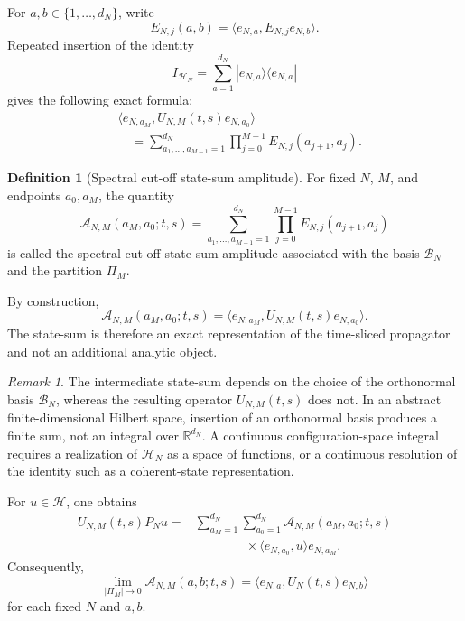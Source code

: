 \documentclass[11pt]{amsart}
\theoremstyle{plain}
\theoremstyle{definition}
\newtheorem{definition}[theorem]{Definition}
\theoremstyle{remark}
\newtheorem{remark}[theorem]{Remark}
\begin{document}
For \(a,b\in\{1,\ldots,d_{N}\}\), write
\[
E_{N,j}(a,b)
=
\langle e_{N,a},E_{N,j}e_{N,b}\rangle.
\]
Repeated insertion of the identity
\[
I_{\mathcal{H}_{N}}
=
\sum_{a=1}^{d_{N}}
|e_{N,a}\rangle\langle e_{N,a}|
\]
gives the following exact formula:
\[
\begin{split}
&\langle e_{N,a_{M}},U_{N,M}(t,s)e_{N,a_{0}}\rangle
\\
&\quad=
\sum_{a_{1},\ldots,a_{M-1}=1}^{d_{N}}
\prod_{j=0}^{M-1}
E_{N,j}(a_{j+1},a_{j}).
\end{split}
\]

\begin{definition}[Spectral cut-off state-sum amplitude]
\label{def:spectral-cutoff-state-sum}
For fixed \(N\), \(M\), and endpoints \(a_{0},a_{M}\), the quantity
\[
\mathcal{A}_{N,M}(a_{M},a_{0};t,s)
=
\sum_{a_{1},\ldots,a_{M-1}=1}^{d_{N}}
\prod_{j=0}^{M-1}
E_{N,j}(a_{j+1},a_{j})
\]
is called the spectral cut-off state-sum amplitude associated with the basis
\(\mathcal{B}_{N}\) and the partition \(\Pi_{M}\).
\end{definition}

By construction,
\[
\mathcal{A}_{N,M}(a_{M},a_{0};t,s)
=
\langle e_{N,a_{M}},U_{N,M}(t,s)e_{N,a_{0}}\rangle.
\]
The state-sum is therefore an exact representation of the time-sliced
propagator and not an additional analytic object.

\begin{remark}
\label{rem:basis-dependence-state-sum}
The intermediate state-sum depends on the choice of the orthonormal basis
\(\mathcal{B}_{N}\), whereas the resulting operator \(U_{N,M}(t,s)\) does not.
In an abstract finite-dimensional Hilbert space, insertion of an orthonormal
basis produces a finite sum, not an integral over
\(\mathbb{R}^{d_{N}}\). A continuous configuration-space integral requires a
realization of \(\mathcal{H}_{N}\) as a space of functions, or a continuous
resolution of the identity such as a coherent-state representation.
\end{remark}

For \(u\in\mathcal{H}\), one obtains
\[
\begin{split}
U_{N,M}(t,s)P_{N}u
={}&
\sum_{a_{M}=1}^{d_{N}}
\sum_{a_{0}=1}^{d_{N}}
\mathcal{A}_{N,M}(a_{M},a_{0};t,s)
\\
&\qquad\qquad\times
\langle e_{N,a_{0}},u\rangle e_{N,a_{M}}.
\end{split}
\]
Consequently,
\[
\lim_{|\Pi_{M}|\to 0}
\mathcal{A}_{N,M}(a,b;t,s)
=
\langle e_{N,a},U_{N}(t,s)e_{N,b}\rangle
\]
for each fixed \(N\) and \(a,b\).
\end{document}
